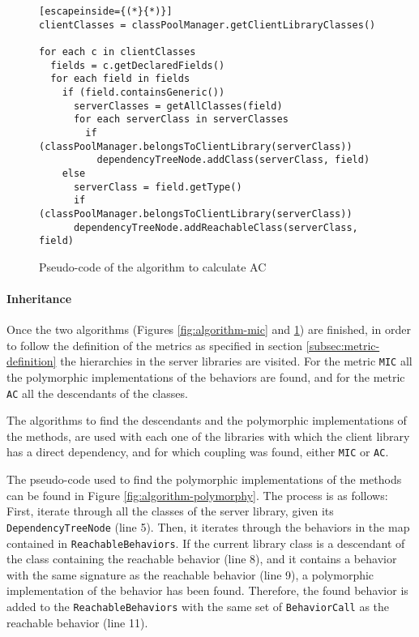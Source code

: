 \begin{figure}[ht!]
\begin{lstlisting}[escapeinside={(*}{*)}]
clientClasses = classPoolManager.getClientLibraryClasses()

for each c in clientClasses
  fields = c.getDeclaredFields()
  for each field in fields
    if (field.containsGeneric())
      serverClasses = getAllClasses(field)
      for each serverClass in serverClasses
        if (classPoolManager.belongsToClientLibrary(serverClass))
          dependencyTreeNode.addClass(serverClass, field)
    else
      serverClass = field.getType()
      if (classPoolManager.belongsToClientLibrary(serverClass))
      dependencyTreeNode.addReachableClass(serverClass, field)
\end{lstlisting}
\caption{Pseudo-code of the algorithm to calculate AC}
\label{fig:algorithm-ac}
\end{figure}

\paragraph{Inheritance}
Once the two algorithms (Figures \ref{fig:algorithm-mic} and \ref{fig:algorithm-ac}) are finished, in order to follow the definition of the metrics as specified in section \ref{subsec:metric-definition} the hierarchies in the server libraries are visited. For the metric \texttt{MIC} all the polymorphic implementations of the behaviors are found, and for the metric \texttt{AC} all the descendants of the classes.

The algorithms to find the descendants and the polymorphic implementations of the methods, are used with each one of the libraries with which the client library has a direct dependency, and for which coupling was found, either \texttt{MIC} or \texttt{AC}.

The pseudo-code used to find the polymorphic implementations of the methods can be found in Figure \ref{fig:algorithm-polymorphy}. The process is as follows: First, iterate through all the classes of the server library, given its \texttt{DependencyTreeNode} (line 5). Then, it iterates through the behaviors in the map contained in \texttt{ReachableBehaviors}. If the current library class is a descendant of the class containing the reachable behavior (line 8), and it contains a behavior with the same signature as the reachable behavior (line 9), a polymorphic implementation of the behavior has been found. Therefore, the found behavior is added to the \texttt{ReachableBehaviors} with the same set of \texttt{BehaviorCall} as the reachable behavior (line 11).


